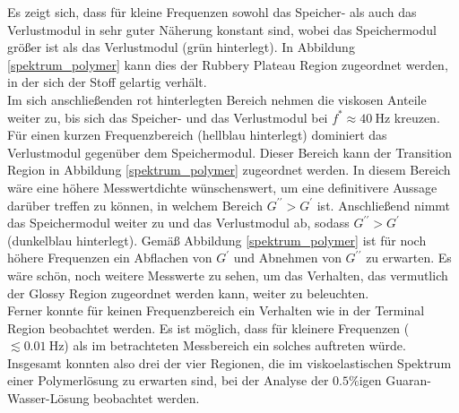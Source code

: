 \documentclass[11pt,a4paper,oneside]{scrartcl}
\begin{document}
Es zeigt sich, dass für kleine Frequenzen sowohl das Speicher- als auch das Verlustmodul in sehr guter Näherung konstant sind, wobei das Speichermodul größer ist als das Verlustmodul (grün hinterlegt). In Abbildung \ref{spektrum_polymer} kann dies der Rubbery Plateau Region zugeordnet werden, in der sich der Stoff gelartig verhält. \\
Im sich anschließenden rot hinterlegten Bereich nehmen die viskosen Anteile weiter zu, bis sich das Speicher- und das Verlustmodul bei $f^*\approx40\ \mathrm{Hz}$ kreuzen. Für einen kurzen Frequenzbereich (hellblau hinterlegt) dominiert das Verlustmodul gegenüber dem Speichermodul. Dieser Bereich kann der Transition Region in Abbildung \ref{spektrum_polymer} zugeordnet werden. In diesem Bereich wäre eine höhere Messwertdichte wünschenswert, um eine definitivere Aussage darüber treffen zu können, in welchem Bereich $G^{\prime\prime}>G^\prime$ ist. Anschließend nimmt das Speichermodul weiter zu und das Verlustmodul ab, sodass $G^{\prime\prime}>G^\prime$ (dunkelblau hinterlegt). Gemäß Abbildung \ref{spektrum_polymer} ist für noch höhere Frequenzen ein Abflachen von $G^\prime$ und Abnehmen von $G^{\prime\prime}$ zu erwarten. Es wäre schön, noch weitere Messwerte zu sehen, um das Verhalten, das vermutlich der Glossy Region zugeordnet werden kann, weiter zu beleuchten.\\
Ferner konnte für keinen Frequenzbereich ein Verhalten wie in der Terminal Region beobachtet werden. Es ist möglich, dass für kleinere Frequenzen ($\lesssim0.01\ \mathrm{Hz}$) als im betrachteten Messbereich ein solches auftreten würde. \\
Insgesamt konnten also drei der vier Regionen, die im viskoelastischen Spektrum einer Polymerlösung zu erwarten sind, bei der Analyse der $0.5\%$igen Guaran-Wasser-Lösung beobachtet werden. 
\end{document}
